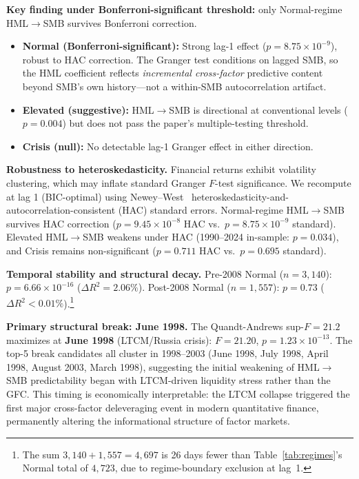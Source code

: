 \documentclass[sigconf,anonymous]{acmart}
\begin{document}
\textbf{Key finding under Bonferroni-significant threshold:} only Normal-regime
HML$\to$SMB survives Bonferroni correction.
\begin{itemize}
    \item \textbf{Normal (Bonferroni-significant):} Strong lag-1 effect
    ($p = 8.75 \times 10^{-9}$), robust to HAC correction. The Granger test conditions
    on lagged SMB, so the HML coefficient reflects \emph{incremental cross-factor}
    predictive content beyond SMB's own history---not a within-SMB autocorrelation artifact.
    \item \textbf{Elevated (suggestive):} HML$\to$SMB is directional at
    conventional levels ($p = 0.004$) but does not pass the paper's
    multiple-testing threshold.
    \item \textbf{Crisis (null):} No detectable lag-1 Granger effect in either
    direction.
\end{itemize}

\textbf{Robustness to heteroskedasticity.}
Financial returns exhibit volatility clustering, which may inflate standard Granger
$F$-test significance. We recompute at lag 1 (BIC-optimal) using Newey--West~\cite{newey1987simple}
heteroskedasticity-and-autocorrelation-consistent (HAC) standard errors.
Normal-regime HML$\to$SMB survives HAC correction
($p = 9.45 \times 10^{-8}$ HAC vs.\ $p = 8.75 \times 10^{-9}$ standard).
Elevated HML$\to$SMB weakens under HAC (1990--2024 in-sample: $p = 0.034$), and Crisis remains
non-significant ($p = 0.711$ HAC vs.\ $p = 0.695$ standard).

\textbf{Temporal stability and structural decay.}
Pre-2008 Normal ($n = 3{,}140$): $p = 6.66 \times 10^{-16}$ ($\Delta R^2 = 2.06\%$).
Post-2008 Normal ($n = 1{,}557$): $p = 0.73$ ($\Delta R^2 < 0.01\%$).\footnote{The
sum $3{,}140 + 1{,}557 = 4{,}697$ is 26 days fewer than Table~\ref{tab:regimes}'s
Normal total of $4{,}723$, due to regime-boundary exclusion at lag~1.}

\textbf{Primary structural break: June 1998.}
The Quandt-Andrews sup-$F = 21.2$ maximizes at \textbf{June 1998} (LTCM/Russia crisis):
$F = 21.20$, $p = 1.23 \times 10^{-13}$.
The top-5 break candidates all cluster in 1998--2003
(June 1998, July 1998, April 1998, August 2003, March 1998),
suggesting the initial weakening of HML$\to$SMB predictability began with
LTCM-driven liquidity stress rather than the GFC.
This timing is economically interpretable: the LTCM collapse triggered
the first major cross-factor deleveraging event in modern quantitative finance,
permanently altering the informational structure of factor markets.
\end{document}
